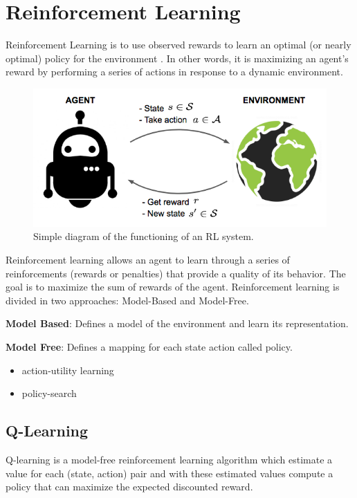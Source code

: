 \section{Reinforcement Learning}
Reinforcement Learning is to use observed rewards to learn an optimal (or nearly optimal)
policy for the environment \cite{russell2002artificial}. In other words, it is maximizing an
agent's reward by performing a series of actions in response to a dynamic environment.

\begin{figure}[ht]
    \centering
    \includegraphics[scale=0.4]{images/RL_illustration.png}
    \caption{Simple diagram of the functioning of an RL system.}
    \label{fig:RL_illustration}
\end{figure}

\newpage
\noindent
Reinforcement learning allows an agent to learn through a series of reinforcements (rewards or penalties) that provide a quality of its behavior.
The goal is to maximize the sum of rewards of the agent.
Reinforcement learning is divided in two approaches: Model-Based and Model-Free.

\vspace{4mm}
\textbf{Model Based}: Defines a model of the environment and learn its representation.

\textbf{Model Free}: Defines a mapping for each state action called policy.
\begin{itemize}
    \item action-utility learning
    \item policy-search
\end{itemize}

\subsection{Q-Learning}
Q-learning \cite{watkins1992q} is a model-free reinforcement learning algorithm which estimate a value for each (state, action) pair
and with these estimated values compute a policy that can maximize the expected discounted reward.

